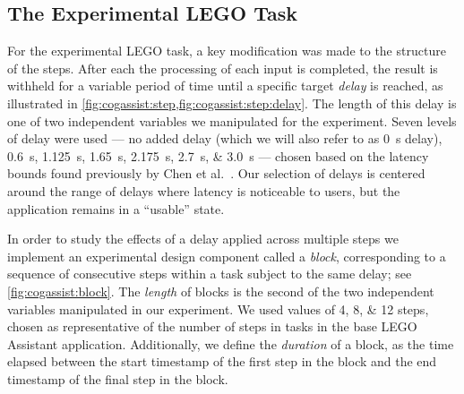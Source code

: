 \documentclass[10pt,letterpaper]{article}
\begin{document}
\subsection{The Experimental LEGO Task}

For the experimental LEGO task, a key modification was made to the structure of the steps.
After each the processing of each input is completed, the result is withheld for a variable period of time until a specific target \emph{delay} is reached, as illustrated in \cref{fig:cogassist:step,fig:cogassist:step:delay}.
The length of this delay is one of two independent variables we manipulated for the experiment.
Seven levels of delay were used --- no added delay (which we will also refer to as \SI{0}{\second} delay), \SIlist{0.6;1.125;1.65;2.175;2.7;3.0}{\second} --- chosen based on the latency bounds found previously by Chen et al.~\cite{Chen:AnEmpiricalStudyOfLatency}.
Our selection of delays is centered around the range of delays where latency is noticeable to users, but the application remains in a ``usable'' state.

In order to study the effects of a delay applied across multiple steps we implement an experimental design component called a \emph{block}, corresponding to a sequence of consecutive steps within a task subject to the same delay; see \cref{fig:cogassist:block}.
The \emph{length} of blocks is the second of the two independent variables manipulated in our experiment.
We used values of \numlist{4;8;12} steps, chosen as representative of the number of steps in tasks in the base LEGO Assistant application.
Additionally, we define the \emph{duration} of a block, as the time elapsed between the start timestamp of the first step in the block and the end timestamp of the final step in the block.
\end{document}
